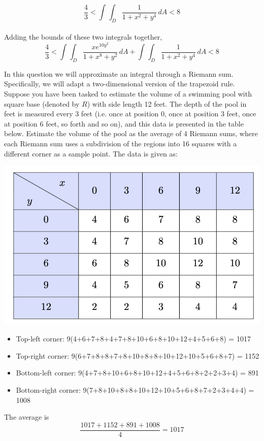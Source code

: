 \documentclass[12pt]{exam}
\begin{document}
\begin{questions}
\begin{solution}
        \[ \frac{4}{3} < \int_{}^{} \int_{D}^{} \frac{1}{1 + x^2 + y^4}\, dA < 8\] \\
        Adding the bounds of these two integrals together, 
        \[ \boxed{ \frac{4}{3} < \int_{}^{} \int_{D}^{} \frac{xe^{10y^2}}{1+ x^8 + y^2}\, dA + \int_{}^{} \int_{D}^{} \frac{1}{1 + x^2 + y^4}\, dA < 8 } \tag*{\qed}\] 
    \end{solution}
\clearpage
\question  In this question we will approximate an integral through a Riemann sum. Specifically, we will adapt a two-dimensional version of the trapezoid rule. Suppose you have been tasked to estimate the volume of
a swimming pool with square base (denoted by $R$) with side length 12 feet. The depth of the pool in feet is measured every 3 feet (i.e. once at position 0, once at position 3 feet, once at position 6 feet, so
forth and so on), and this data is presented in the table below. Estimate the volume of the pool as the average of 4 Riemann sums, where each Riemann sum uses a subdivision of the regions into 16 squares
with a different corner as a sample point. The data is given as:
\begin{center}
    \includegraphics*[scale=0.7]{images/06-data.png}
\end{center}
    \begin{solution}
        \begin{itemize}
            \item Top-left corner: 9(4+6+7+8+4+7+8+10+6+8+10+12+4+5+6+8) = 1017
            \item Top-right corner: 9(6+7+8+8+7+8+10+8+8+10+12+10+5+6+8+7) = 1152
            \item Bottom-left corner: 9(4+7+8+10+6+8+10+12+4+5+6+8+2+2+3+4) = 891
            \item Bottom-right corner: 9(7+8+10+8+8+10+12+10+5+6+8+7+2+3+4+4) = 1008
        \end{itemize}
        The average is 
        \[\frac{1017 + 1152 + 891 + 1008}{4} = \boxed{1017} \tag*{\qed}\]
    \end{solution}
\end{questions}
\end{document}
